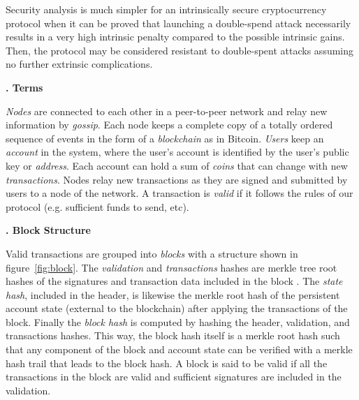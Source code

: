 \documentclass[letter,11pt]{article}
\newcounter{myseccnt}     %
\newcounter{mysubseccnt}  %
\newcommand{\mysection}[1]
{\vspace{9mm}\noindent\fontsize{13pt}{15pt}\setcounter{mysubseccnt}{0}
\stepcounter{myseccnt}\textbf{\arabic{myseccnt}. #1}\normalsize\vspace{5mm}}
\begin{document}
Security analysis is much simpler for an intrinsically secure cryptocurrency protocol when it can be proved that launching a double-spend attack necessarily results in a very high intrinsic penalty compared to the possible intrinsic gains.  Then, the protocol may be considered resistant to double-spent attacks assuming no further extrinsic complications.



\mysection{Terms}

\textit{Nodes} are connected to each other in a peer-to-peer network and relay new information by \textit{gossip}. Each node keeps a complete copy of a totally ordered sequence of events in the form of a \textit{blockchain} as in Bitcoin. \textit{Users} keep an \textit{account} in the system, where the user’s account is identified by the user’s public key or \textit{address}.  Each account can hold a sum of \textit{coins} that can change with new \textit{transactions}. Nodes relay new transactions as they are signed and submitted by users to a node of the network.  A transaction is \textit{valid} if it follows the rules of our protocol (e.g. sufficient funds to send, etc).


\mysection{Block Structure}

Valid transactions are grouped into \textit{blocks} with a structure shown in figure~\ref{fig:block}.  The \textit{validation} and \textit{transactions} hashes are merkle tree root hashes of the signatures and transaction data included in the block \cite{article:merkle}.  The \textit{state hash}, included in the header, is likewise the merkle root hash of the persistent account state (external to the blockchain) after applying the transactions of the block.    Finally the \textit{block hash} is computed by hashing the header, validation, and transactions hashes.  This way, the block hash itself is a merkle root hash such that any component of the block and account state can be verified with a merkle hash trail that leads to the block hash.  A block is said to be valid if all the transactions in the block are valid and sufficient signatures are included in the validation.
\end{document}
